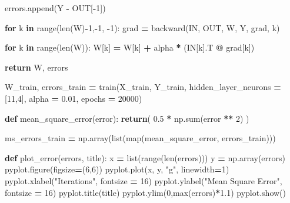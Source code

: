 \documentclass[
]{book}
\newenvironment{Shaded}{\begin{snugshade}}{\end{snugshade}}
\newcommand{\BuiltInTok}[1]{#1}
\newcommand{\ControlFlowTok}[1]{\textcolor[rgb]{0.13,0.29,0.53}{\textbf{#1}}}
\newcommand{\DecValTok}[1]{\textcolor[rgb]{0.00,0.00,0.81}{#1}}
\newcommand{\FloatTok}[1]{\textcolor[rgb]{0.00,0.00,0.81}{#1}}
\newcommand{\KeywordTok}[1]{\textcolor[rgb]{0.13,0.29,0.53}{\textbf{#1}}}
\newcommand{\NormalTok}[1]{#1}
\newcommand{\OperatorTok}[1]{\textcolor[rgb]{0.81,0.36,0.00}{\textbf{#1}}}
\newcommand{\StringTok}[1]{\textcolor[rgb]{0.31,0.60,0.02}{#1}}
\begin{document}
\begin{Shaded}
\begin{Highlighting}[]
\NormalTok{    errors.append(Y }\OperatorTok{{-}}\NormalTok{ OUT[}\OperatorTok{{-}}\DecValTok{1}\NormalTok{])}
      
    \ControlFlowTok{for}\NormalTok{ k }\KeywordTok{in} \BuiltInTok{range}\NormalTok{(}\BuiltInTok{len}\NormalTok{(W)}\OperatorTok{{-}}\DecValTok{1}\NormalTok{,}\OperatorTok{{-}}\DecValTok{1}\NormalTok{, }\OperatorTok{{-}}\DecValTok{1}\NormalTok{):}
\NormalTok{      grad }\OperatorTok{=}\NormalTok{ backward(IN, OUT, W, Y, grad, k) }
      
    \ControlFlowTok{for}\NormalTok{ k }\KeywordTok{in} \BuiltInTok{range}\NormalTok{(}\BuiltInTok{len}\NormalTok{(W)):}
\NormalTok{      W[k] }\OperatorTok{=}\NormalTok{ W[k] }\OperatorTok{+}\NormalTok{ alpha }\OperatorTok{*}\NormalTok{ (IN[k].T }\OperatorTok{@}\NormalTok{ grad[k])}
      
  \ControlFlowTok{return}\NormalTok{ W, errors}



\NormalTok{W\_train, errors\_train }\OperatorTok{=}\NormalTok{ train(X\_train, Y\_train, hidden\_layer\_neurons }\OperatorTok{=}\NormalTok{ [}\DecValTok{11}\NormalTok{,}\DecValTok{4}\NormalTok{], alpha }\OperatorTok{=} \FloatTok{0.01}\NormalTok{, epochs }\OperatorTok{=} \DecValTok{20000}\NormalTok{)}


\KeywordTok{def}\NormalTok{ mean\_square\_error(error):}
  \ControlFlowTok{return}\NormalTok{( }\FloatTok{0.5} \OperatorTok{*}\NormalTok{ np.}\BuiltInTok{sum}\NormalTok{(error }\OperatorTok{**} \DecValTok{2}\NormalTok{) )}

\NormalTok{ms\_errors\_train }\OperatorTok{=}\NormalTok{ np.array(}\BuiltInTok{list}\NormalTok{(}\BuiltInTok{map}\NormalTok{(mean\_square\_error, errors\_train)))}

\KeywordTok{def}\NormalTok{ plot\_error(errors, title):}
\NormalTok{  x }\OperatorTok{=} \BuiltInTok{list}\NormalTok{(}\BuiltInTok{range}\NormalTok{(}\BuiltInTok{len}\NormalTok{(errors)))}
\NormalTok{  y }\OperatorTok{=}\NormalTok{ np.array(errors)}
\NormalTok{  pyplot.figure(figsize}\OperatorTok{=}\NormalTok{(}\DecValTok{6}\NormalTok{,}\DecValTok{6}\NormalTok{))}
\NormalTok{  pyplot.plot(x, y, }\StringTok{"g"}\NormalTok{, linewidth}\OperatorTok{=}\DecValTok{1}\NormalTok{)}
\NormalTok{  pyplot.xlabel(}\StringTok{"Iterations"}\NormalTok{, fontsize }\OperatorTok{=} \DecValTok{16}\NormalTok{)}
\NormalTok{  pyplot.ylabel(}\StringTok{"Mean Square Error"}\NormalTok{, fontsize }\OperatorTok{=} \DecValTok{16}\NormalTok{)}
\NormalTok{  pyplot.title(title)}
\NormalTok{  pyplot.ylim(}\DecValTok{0}\NormalTok{,}\BuiltInTok{max}\NormalTok{(errors)}\OperatorTok{*}\FloatTok{1.1}\NormalTok{)}
\NormalTok{  pyplot.show()}
  

\end{Highlighting}
\end{Shaded}
\end{document}
